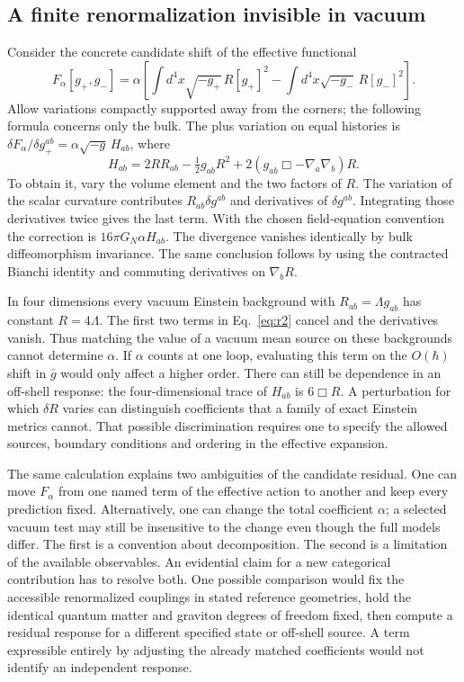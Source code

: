 \documentclass[11pt,letterpaper]{article}
\begin{document}
\subsection{A finite renormalization invisible in vacuum}
Consider the concrete candidate shift of the effective functional
\[
 F_\alpha[g_+,g_-]=\alpha\left[
  \int\!d^4x\sqrt{-g_+}\,R[g_+]^2
 -\int\!d^4x\sqrt{-g_-}\,R[g_-]^2\right].
\]
Allow variations compactly supported away from the corners; the following
formula concerns only the bulk. The plus variation on equal histories is
\(\delta F_\alpha/\delta g_+^{ab}=\alpha\sqrt{-g}\,H_{ab}\), where
\begin{equation}
 H_{ab}=2R R_{ab}-\tfrac12 g_{ab}R^2
             +2(g_{ab}\Box-\nabla_a\nabla_b)R .
 \label{eq:r2}
\end{equation}
To obtain it, vary the volume element and the two factors of \(R\).
The variation of the scalar curvature contributes \(R_{ab}\delta g^{ab}\)
and derivatives of \(\delta g^{ab}\). Integrating those derivatives
twice gives the last term. With the chosen field-equation convention
the correction is \(16\pi G_N\alpha H_{ab}\).
The divergence vanishes identically by bulk diffeomorphism invariance.
The same conclusion follows by using the contracted Bianchi identity
and commuting derivatives on \(\nabla_bR\).

In four dimensions every vacuum Einstein background with
\(R_{ab}=\Lambda g_{ab}\) has constant \(R=4\Lambda\).
The first two terms in Eq.~\eqref{eq:r2} cancel and the derivatives
vanish. Thus matching the value of a vacuum mean source on these
backgrounds cannot determine \(\alpha\). If \(\alpha\) counts at one
loop, evaluating this term on the \(O(\hbar)\) shift in \(\bar g\)
would only affect a higher order. There can still be dependence in
an off-shell response: the four-dimensional trace of \(H_{ab}\)
is \(6\Box R\). A perturbation for which \(\delta R\) varies can
distinguish coefficients that a family of exact Einstein metrics cannot.
That possible discrimination requires one to specify the allowed
sources, boundary conditions and ordering in the effective expansion.

The same calculation explains two ambiguities of the candidate residual.
One can move \(F_\alpha\) from one named term of the effective action
to another and keep every prediction fixed. Alternatively, one can
change the total coefficient \(\alpha\); a selected vacuum test may
still be insensitive to the change even though the full models differ.
The first is a convention about decomposition. The second is a
limitation of the available observables. An evidential claim for a
new categorical contribution has to resolve both. One possible
comparison would fix the accessible renormalized couplings in stated
reference geometries, hold the identical quantum matter and graviton
degrees of freedom fixed, then compute a residual response for a
different specified state or off-shell source. A term expressible
entirely by adjusting the already matched coefficients would not
identify an independent response.
\end{document}

